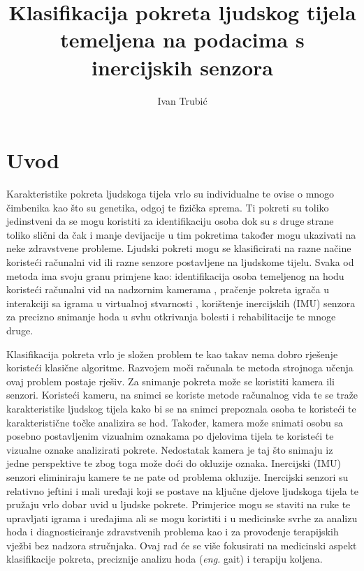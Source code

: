 \documentclass[times, utf8, diplomski]{fer}
\begin{document}

\title{Klasifikacija pokreta ljudskog tijela temeljena na podacima s inercijskih senzora}

\author{Ivan Trubić}

\maketitle


\zahvala{}

\tableofcontents

\chapter{Uvod}
Karakteristike pokreta ljudskoga tijela vrlo su individualne te ovise o mnogo čimbenika kao što su genetika, odgoj te
fizička sprema. Ti pokreti su toliko jedinstveni da se mogu koristiti za identifikaciju osoba dok su s druge strane
toliko slični da čak i manje devijacije u tim pokretima također mogu ukazivati na neke zdravstvene probleme.
Ljudski pokreti mogu se klasificirati na razne načine koristeći računalni vid ili razne senzore postavljene na
ljudskome tijelu. Svaka od metoda ima svoju granu primjene kao: identifikacija osoba temeljenog na hodu koristeći
računalni vid na nadzornim kamerama \citep{surveillance}, pračenje pokreta igrača u interakciji sa igrama u virtualnoj stvarnosti \citep{VR},
korištenje inercijskih (IMU) senzora za precizno snimanje hoda u svhu otkrivanja bolesti i rehabilitacije te mnoge druge.

Klasifikacija pokreta vrlo je složen problem te kao takav nema dobro rješenje koristeći klasične algoritme. Razvojem moči računala
te metoda strojnoga učenja ovaj problem postaje rješiv. Za snimanje pokreta može se koristiti kamera ili senzori.
Koristeći kameru, na snimci se koriste metode računalnog vida te se traže karakteristike ljudskog tijela kako bi se na snimci
prepoznala osoba te koristeći te karakteristične točke analizira se hod. Također, kamera može snimati osobu sa posebno postavljenim
vizualnim oznakama po djelovima tijela te koristeći te vizualne oznake analizirati pokrete. Nedostatak kamera je taj što snimaju iz
jedne perspektive te zbog toga može doći do okluzije oznaka. Inercijski (IMU) senzori eliminiraju kamere te ne pate od problema okluzije.
Inercijski senzori su relativno jeftini i mali uređaji koji se postave na ključne djelove ljudskoga tijela te pružaju vrlo dobar uvid
u ljudske pokrete. Primjerice mogu se staviti na ruke te upravljati igrama i uređajima ali se mogu koristiti i u medicinske svrhe za
analizu hoda i diagnosticiranje zdravstvenih problema kao i za provođenje terapijskih vježbi bez nadzora stručnjaka.
Ovaj rad će se više fokusirati na medicinski aspekt klasifikacije pokreta, preciznije analizu hoda (\textit{eng.} gait) i terapiju koljena.
\end{document}
